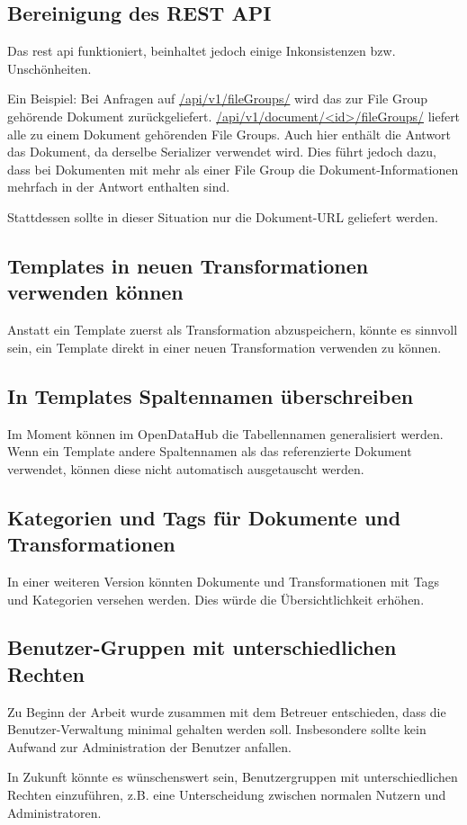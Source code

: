 \subsection{Bereinigung des REST API}
Das \gls{rest} \acs{api} funktioniert, beinhaltet jedoch einige Inkonsistenzen bzw. Unschönheiten. 

Ein Beispiel:
Bei Anfragen auf \url{/api/v1/fileGroups/} wird das zur File Group gehörende Dokument zurückgeliefert.
\url{/api/v1/document/<id>/fileGroups/} liefert alle zu einem Dokument gehörenden File Groups. Auch hier enthält die Antwort das Dokument, da derselbe Serializer verwendet wird. Dies führt jedoch dazu, dass bei Dokumenten mit mehr als einer File Group die Dokument-Informationen mehrfach in der Antwort enthalten sind.

Stattdessen sollte in dieser Situation nur die Dokument-URL geliefert werden.

\subsection{Templates in neuen Transformationen verwenden können}
Anstatt ein Template zuerst als Transformation abzuspeichern, könnte es sinnvoll sein, ein Template direkt in einer neuen Transformation verwenden zu können.

\subsection{In Templates Spaltennamen überschreiben}
Im Moment können im OpenDataHub die Tabellennamen generalisiert werden. Wenn ein Template andere Spaltennamen als das referenzierte Dokument verwendet, können diese nicht automatisch ausgetauscht werden.

\subsection{Kategorien und Tags für Dokumente und Transformationen}
In einer weiteren Version könnten Dokumente und Transformationen mit Tags und Kategorien versehen werden. Dies würde die Übersichtlichkeit erhöhen.

\subsection{Benutzer-Gruppen mit unterschiedlichen Rechten}
Zu Beginn der Arbeit wurde zusammen mit dem Betreuer entschieden, dass die Benutzer-Verwaltung minimal gehalten werden soll. Insbesondere sollte kein Aufwand zur Administration der Benutzer anfallen.

In Zukunft könnte es wünschenswert sein, Benutzergruppen mit unterschiedlichen Rechten einzuführen, z.B. eine Unterscheidung zwischen normalen Nutzern und Administratoren.